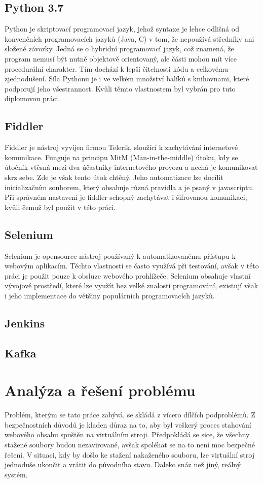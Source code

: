 \documentclass[thesis=M,czech,hidelinks]{FITthesis}[2013/05/06]
\begin{document}
\section{Python 3.7}
Python je skriptovací programovací jazyk, jehož syntaxe je lehce odlišná od konvenčních programovacích jazyků (Java, C) v tom, že nepoužívá středníky ani složené závorky. Jedná se o hybridní programovací jazyk, což znamená, že program nemusí být nutně objektově orientovaný, ale části mohou mít více procedurální charakter. Tím dochází k lepší čitelnosti kódu a celkovému zjednodušení. Síla Pythonu je i ve velkém množství balíků s knihovnami, které podporují jeho všestrannost. Kvůli těmto vlastnostem byl vybrán pro tuto diplomovou práci.

\section{Fiddler}
Fiddler je nástroj vyvíjen firmou Telerik, sloužící k zachytávání internetové komunikace. Funguje na principu MitM (Man-in-the-middle) útoku, kdy se útočník vtěsná mezi dva účastníky internetového provozu a nechá je komunikovat skrz sebe. Zde je však tento útok chtěný. Jeho automatizace lze docílit inicializačním souborem, který obsahuje různá pravidla a je psaný v javascriptu. Při správném nastavení je fiddler schopný zachytávat i šifrovanou komunikaci, kvůli čemuž byl použit v této práci.

\section{Selenium}
Selenium je opensource nástroj používaný k automatizovanému přístupu k webovým aplikacím. Těchto vlastností se často využívá při testování, avšak v této práci je použit pouze k obsluze webového prohlížeče. Selenium obsahuje vlastní vývojové prostředí, které lze využít bez velké znalosti programování, existují však i jeho implementace do většiny populárních programovacích jazyků.


\section{Jenkins}

\section{Kafka}

\chapter{Analýza a řešení problému}
Problém, kterým se tato práce zabývá, se skládá z vícero dílčích podproblémů. Z bezpečnostních důvodů je kladen důraz na to, aby byl veškerý proces stahování webového obsahu spuštěn na virtuálním stroji. Předpokládá se sice, že všechny stažené soubory budou nezavirované, avšak spoléhat se na to není moc bezpečné řešení. V situaci, kdy by došlo ke stažení nakaženého souboru, lze virtuální stroj jednoduše ukončit a vrátit do původního stavu. Daleko snáz než jiný, reálný systém.
\end{document}
